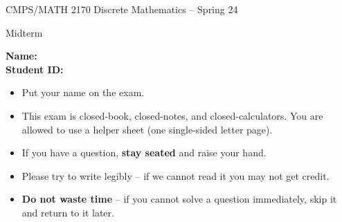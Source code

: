 \documentclass[11pt]{article}
\def\ni{\noindent}
\def\ontest#1{#1}
\def\solution#1{}
\begin{document}
\begin{center}{\Large CMPS/MATH 2170 Discrete Mathematics -- Spring 24}\end{center}
\begin{center}{\huge Midterm}\end{center} 
\flushleft

\vspace*{1cm}
\flushleft{}
{\bf\large Name: \enspace\hrulefill} \\
\bigskip
{\bf\large Student ID: \enspace\hrulefill}
\vspace*{1cm}
%
\ontest{
\ni
\begin{itemize}
\item Put your name on the exam.
\item This exam is closed-book, closed-notes, and closed-calculators. You are allowed to use a helper sheet (one single-sided letter page).
\item If you have a question, {\bf stay seated} and raise your hand.
\item Please try to write legibly -- if we cannot read it you may not get
  credit.
\item {\bf Do not waste time} -- if you cannot solve a question immediately, skip
  it and return to it later. 
\end{itemize}
}%

\solution{
\vspace*{4cm}
\begin{center}
\vspace*{2cm}
\end{center}
}
\end{document}
